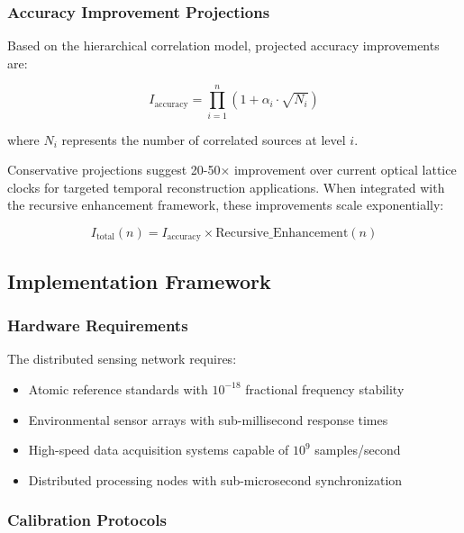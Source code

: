 \documentclass[12pt,a4paper]{article}
\begin{document}
{{{{{{{{{{{{{{\subsubsection{Accuracy Improvement Projections}

Based on the hierarchical correlation model, projected accuracy improvements are:

\begin{equation}
I_{\text{accuracy}} = \prod_{i=1}^{n} (1 + \alpha_i \cdot \sqrt{N_i})
\end{equation}

where $N_i$ represents the number of correlated sources at level $i$.

Conservative projections suggest 20-50× improvement over current optical lattice clocks for targeted temporal reconstruction applications. When integrated with the recursive enhancement framework, these improvements scale exponentially:

\begin{equation}
I_{\text{total}}(n) = I_{\text{accuracy}} \times \text{Recursive\_Enhancement}(n)
\end{equation}

\subsection{Implementation Framework}

\subsubsection{Hardware Requirements}

The distributed sensing network requires:

\begin{itemize}
\item Atomic reference standards with $10^{-18}$ fractional frequency stability
\item Environmental sensor arrays with sub-millisecond response times
\item High-speed data acquisition systems capable of $10^9$ samples/second
\item Distributed processing nodes with sub-microsecond synchronization
\end{itemize}

\subsubsection{Calibration Protocols}

}}}}}}}}}}}}}}
\end{document}
